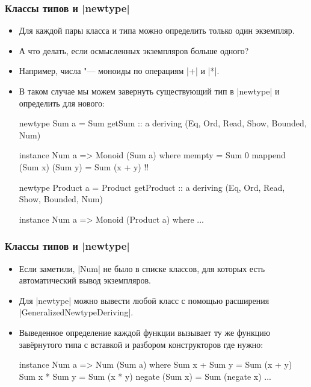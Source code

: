 \documentclass[10pt]{beamer}
\begin{document}
\begin{frame}[fragile]
  \frametitle{Классы типов и \haskinline|newtype|}
  \begin{itemize}
    \item Для каждой пары класса и типа можно определить только один экземпляр.
    \item А что делать, если осмысленных экземпляров больше одного?
    \item Например, числа "--- моноиды по операциям \haskinline|+| и \haskinline|*|.\pause
    \item В таком случае мы можем завернуть существующий тип в \haskinline|newtype| и определить для нового:
          \begin{haskellsmall}
            newtype Sum a = Sum { getSum :: a }
                deriving (Eq, Ord, Read, Show, Bounded, Num)

            instance Num a => Monoid (Sum a) where
                mempty = Sum 0
                mappend (Sum x) (Sum y) = Sum (x + y) !\pause!

            newtype Product a = Product { getProduct :: a }
                deriving (Eq, Ord, Read, Show, Bounded, Num)

            instance Num a => Monoid (Product a) where ...
          \end{haskellsmall}
  \end{itemize}
\end{frame}

\begin{frame}[fragile]
  \frametitle{Классы типов и \haskinline|newtype|}
  \begin{itemize}
    \item Если заметили, \haskinline|Num| не было в списке классов, для которых есть автоматический вывод экземпляров.
    \item Для \haskinline|newtype| можно вывести любой класс с помощью расширения \haskinline|GeneralizedNewtypeDeriving|.\pause
    \item Выведенное определение каждой функции вызывает ту же функцию завёрнутого типа с вставкой и разбором конструкторов где нужно:
          \begin{haskell}
            instance Num a => Num (Sum a) where
                Sum x + Sum y = Sum (x + y)
                Sum x * Sum y = Sum (x * y)
                negate (Sum x) = Sum (negate x)
                ...
          \end{haskell}
  \end{itemize}
\end{frame}
\end{document}
